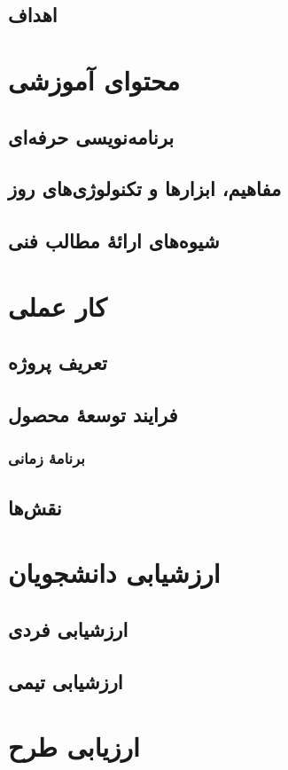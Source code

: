 \documentclass[a4paper,notitlepage]{report}
\begin{document}
\section{اهداف}
\chapter{محتوای آموزشی}
\section{برنامه‌نویسی حرفه‌ای}
\section{مفاهیم، ابزارها و تکنولوژی‌های روز}
\section{شیوه‌های ارائهٔ مطالب فنی}
\chapter{کار عملی}
\section{تعریف پروژه}
\section{فرایند توسعهٔ محصول}
\subsection{برنامهٔ زمانی}
\section{نقش‌ها}
\chapter{ارزشیابی دانشجویان}
\section{ارزشیابی فردی}
\section{ارزشیابی تیمی}
\chapter{ارزیابی طرح}
\end{document}
